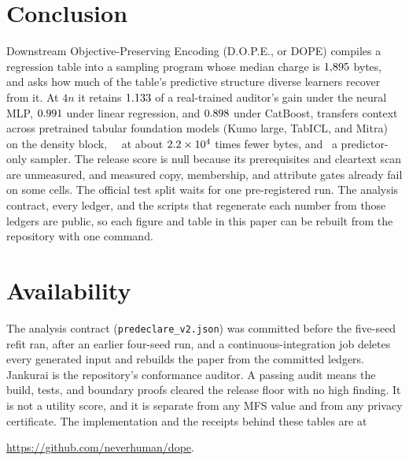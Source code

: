 \documentclass{article} %
\begin{document}
\section{Conclusion}
Downstream Objective-Preserving Encoding (D.O.P.E., or DOPE) compiles a regression table into a sampling program whose median charge is $1{,}895$ bytes, and asks how much of the table's predictive structure diverse learners recover from it. At $4n$ it retains $1.133$ of a real-trained auditor's gain under the neural MLP, $0.991$ under linear regression, and $0.898$ under CatBoost, transfers context across pretrained tabular foundation models (Kumo large, TabICL, and Mitra) on the density block, \VVerdictStrong\ \VStrongestName\ at about $2.2\times 10^{4}$ times fewer bytes, and \VVerdictPredCbFour\ a predictor-only sampler. The release score is null because its prerequisites and cleartext scan are unmeasured, and measured copy, membership, and attribute gates already fail on some cells. The official test split waits for one pre-registered run. The analysis contract, every ledger, and the scripts that regenerate each number from those ledgers are public, so each figure and table in this paper can be rebuilt from the repository with one command.

\section*{Availability}
The analysis contract (\texttt{predeclare\_v2.json}) was committed before the five-seed refit ran, after an earlier four-seed run, and a continuous-integration job deletes every generated input and rebuilds the paper from the committed ledgers. Jankurai is the repository's conformance auditor. A passing audit means
the build, tests, and boundary proofs cleared the release floor with no
high finding. It is not a utility score, and it is separate from any MFS value and from any
privacy certificate.
The implementation and the receipts behind these tables are at

\noindent\mbox{\url{https://github.com/neverhuman/dope}}.



\end{document}
